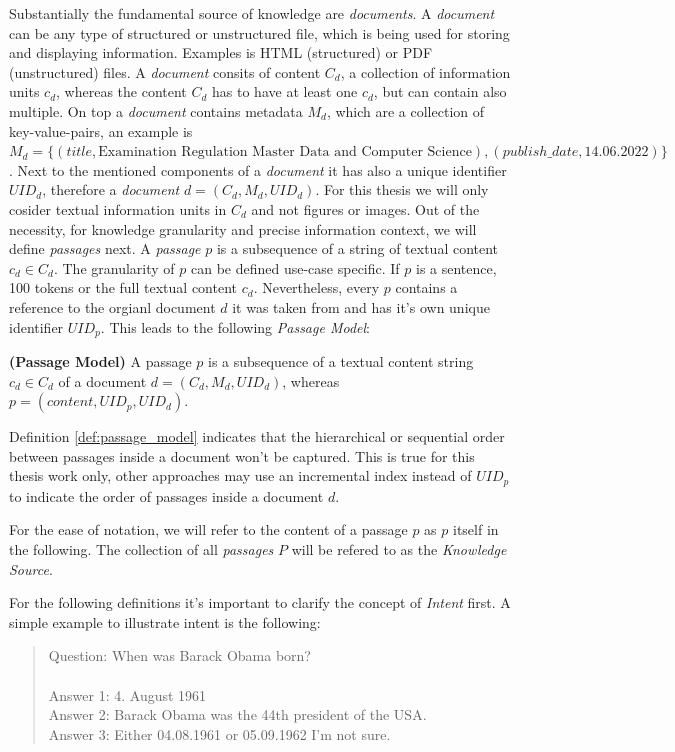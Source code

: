 Substantially the fundamental source of knowledge are \textit{documents}. A \textit{document} can be any type of structured or unstructured file, which is being used for storing and displaying information. Examples is HTML (structured) or PDF (unstructured) files. A \textit{document} consits of content $C_d$, a collection of information units $c_d$, whereas the content $C_d$ has to have at least one $c_d$, but can contain also multiple. On top a \textit{document} contains metadata $M_d$, which are a collection of key-value-pairs, an example is $M_d = \{(title,\text{Examination Regulation Master Data and Computer Science}),\allowbreak (publish\_date \allowbreak, 14.06.2022)\}$. Next to the mentioned components of a \textit{document} it has also a unique identifier $UID_d$, therefore a \textit{document} $d = (C_d, M_d, UID_d)$. For this thesis we will only cosider textual information units in $C_d$ and not figures or images. Out of the necessity, for knowledge granularity and precise information context, we will define \textit{passages} next. A \textit{passage} $p$ is a subsequence of a string of textual content $c_d \in C_d$. The granularity of $p$ can be defined use-case specific. If $p$ is a sentence, 100 tokens or the full textual content $c_d$. Nevertheless, every $p$ contains a reference to the orgianl document $d$ it was taken from and has it's own unique identifier $UID_p$. This leads to the following \textit{Passage Model}:
\begin{definition}
    \textbf{(Passage Model)} A passage $p$ is a subsequence of a textual content string $c_d \in C_d$ of a document $d = (C_d,M_d, UID_d)$, whereas $p = (content, UID_p, UID_d)$.
    \label{def:passage_model}
\end{definition}

Definition \ref{def:passage_model} indicates that the hierarchical or sequential order between passages inside a document won't be captured. This is true for this thesis work only, other approaches may use an incremental index instead of $UID_p$ to indicate the order of passages inside a document $d$.

For the ease of notation, we will refer to the content of a passage $p$ as $p$ itself in the following. The collection of all \textit{passages} $P$ will be refered to as the \textit{Knowledge Source}. 

For the following definitions it's important to clarify the concept of \textit{Intent} first. A simple example to illustrate intent is the following:

\begin{quotation}
\noindent Question: When was Barack Obama born? \\\\
Answer 1: 4. August 1961 \\
Answer 2: Barack Obama was the 44th president of the USA. \\
Answer 3: Either 04.08.1961 or 05.09.1962 I'm not sure. 
\end{quotation}


